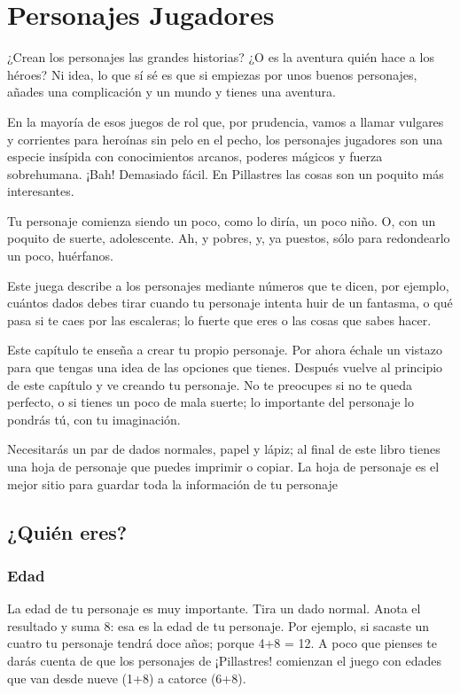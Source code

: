 \chapter{Personajes Jugadores}

¿Crean los personajes las grandes historias? ¿O es la aventura quién hace a los héroes? Ni idea, lo que sí sé es que si empiezas por unos buenos personajes, añades una complicación y un mundo y tienes una aventura. 

En la mayoría de esos juegos de rol que, por prudencia, vamos a llamar vulgares y corrientes para heroínas sin pelo en el pecho, los personajes jugadores son una especie insípida con conocimientos arcanos, poderes mágicos y fuerza sobrehumana. ¡Bah! Demasiado fácil. En Pillastres las cosas son un poquito más interesantes.

Tu personaje comienza siendo un poco, como lo diría, un poco niño. O, con un poquito de suerte, adolescente. Ah, y pobres, y, ya puestos, sólo para redondearlo un poco, huérfanos.

Este juega describe a los personajes mediante números que te dicen, por ejemplo, cuántos dados debes tirar cuando tu personaje intenta huir de un fantasma, o qué pasa si te caes por las escaleras; lo fuerte que eres o las cosas que sabes hacer.


Este capítulo te enseña a crear tu propio personaje. Por ahora échale un vistazo para que tengas una idea de las opciones que tienes. Después vuelve al principio de este capítulo y ve creando tu personaje. No te preocupes si no te queda perfecto, o si tienes un poco de mala suerte; lo importante del personaje lo pondrás tú, con tu imaginación.

Necesitarás un par de dados normales, papel y lápiz; al final de este libro tienes una hoja de personaje que puedes imprimir o copiar. La hoja de personaje es el mejor sitio para guardar toda la información de tu personaje 

\section{¿Quién eres?}

\subsection*{Edad}

La edad de tu personaje es muy importante. Tira un dado normal. Anota el resultado y suma 8: esa es la edad de tu personaje. Por ejemplo, si sacaste un cuatro tu personaje tendrá doce años; porque 4+8 = 12. A poco que pienses te darás cuenta de que los personajes de ¡Pillastres! comienzan el juego con edades que van desde nueve (1+8) a catorce (6+8).

